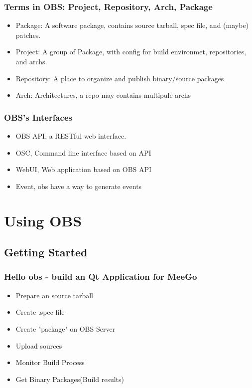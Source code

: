 \documentclass{beamer}
\begin{document}
\begin{frame}
  \frametitle{Terms in OBS: Project, Repository, Arch, Package}
  \begin{itemize}
    \item Package: A software package, contains source tarball, spec file, and (maybe) patches.
    \item Project: A group of Package, with config for build environmet, repositories, and archs.
    \item Repository: A place to organize and publish binary/source packages
    \item Arch: Architectures, a repo may contains multipule archs
  \end{itemize}
\end{frame}

\begin{frame}
  \frametitle{OBS's Interfaces}
  \begin{itemize}
    \item OBS API, a RESTful web interface.
    \item OSC, Command line interface based on API
    \item WebUI, Web application based on OBS API
    \item Event, obs have a way to generate events
  \end{itemize}
\end{frame}

\section{Using OBS}
\subsection{Getting Started}
\begin{frame}
  \frametitle{Hello obs - build an Qt Application for MeeGo}
  \begin{itemize}
    \item Prepare an source tarball
    \item Create .spec file
    \item Create "package" on OBS Server
    \item Upload sources
    \item Monitor Build Process
    \item Get Binary Packages(Build results)
  \end{itemize}
\end{frame}
\end{document}
